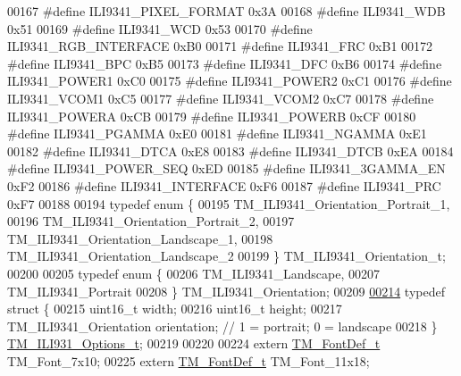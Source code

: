 \begin{DoxyCode}
00167 \textcolor{preprocessor}{#define ILI9341\_PIXEL\_FORMAT        0x3A}
00168 \textcolor{preprocessor}{#define ILI9341\_WDB                 0x51}
00169 \textcolor{preprocessor}{#define ILI9341\_WCD                 0x53}
00170 \textcolor{preprocessor}{#define ILI9341\_RGB\_INTERFACE       0xB0}
00171 \textcolor{preprocessor}{#define ILI9341\_FRC                 0xB1}
00172 \textcolor{preprocessor}{#define ILI9341\_BPC                 0xB5}
00173 \textcolor{preprocessor}{#define ILI9341\_DFC                 0xB6}
00174 \textcolor{preprocessor}{#define ILI9341\_POWER1              0xC0}
00175 \textcolor{preprocessor}{#define ILI9341\_POWER2              0xC1}
00176 \textcolor{preprocessor}{#define ILI9341\_VCOM1               0xC5}
00177 \textcolor{preprocessor}{#define ILI9341\_VCOM2               0xC7}
00178 \textcolor{preprocessor}{#define ILI9341\_POWERA              0xCB}
00179 \textcolor{preprocessor}{#define ILI9341\_POWERB              0xCF}
00180 \textcolor{preprocessor}{#define ILI9341\_PGAMMA              0xE0}
00181 \textcolor{preprocessor}{#define ILI9341\_NGAMMA              0xE1}
00182 \textcolor{preprocessor}{#define ILI9341\_DTCA                0xE8}
00183 \textcolor{preprocessor}{#define ILI9341\_DTCB                0xEA}
00184 \textcolor{preprocessor}{#define ILI9341\_POWER\_SEQ           0xED}
00185 \textcolor{preprocessor}{#define ILI9341\_3GAMMA\_EN           0xF2}
00186 \textcolor{preprocessor}{#define ILI9341\_INTERFACE           0xF6}
00187 \textcolor{preprocessor}{#define ILI9341\_PRC                 0xF7}
00188 
00194 \textcolor{keyword}{typedef} \textcolor{keyword}{enum} \{
00195     TM\_ILI9341\_Orientation\_Portrait\_1,
00196     TM\_ILI9341\_Orientation\_Portrait\_2,
00197     TM\_ILI9341\_Orientation\_Landscape\_1,
00198     TM\_ILI9341\_Orientation\_Landscape\_2
00199 \} TM\_ILI9341\_Orientation\_t;
00200 
00205 \textcolor{keyword}{typedef} \textcolor{keyword}{enum} \{
00206     TM\_ILI9341\_Landscape,
00207     TM\_ILI9341\_Portrait
00208 \} TM\_ILI9341\_Orientation;
00209 
\hypertarget{tm__stm32f4__ili9341_8h_source_l00214}{}\hyperlink{struct_t_m___i_l_i931___options__t}{00214} \textcolor{keyword}{typedef} \textcolor{keyword}{struct }\{
00215     uint16\_t width;
00216     uint16\_t height;
00217     TM\_ILI9341\_Orientation orientation; \textcolor{comment}{// 1 = portrait; 0 = landscape}
00218 \} \hyperlink{struct_t_m___i_l_i931___options__t}{TM\_ILI931\_Options\_t};
00219 
00220 
00224 \textcolor{keyword}{extern} \hyperlink{struct_t_m___font_def__t}{TM\_FontDef\_t} TM\_Font\_7x10;
00225 \textcolor{keyword}{extern} \hyperlink{struct_t_m___font_def__t}{TM\_FontDef\_t} TM\_Font\_11x18;

\end{DoxyCode}
